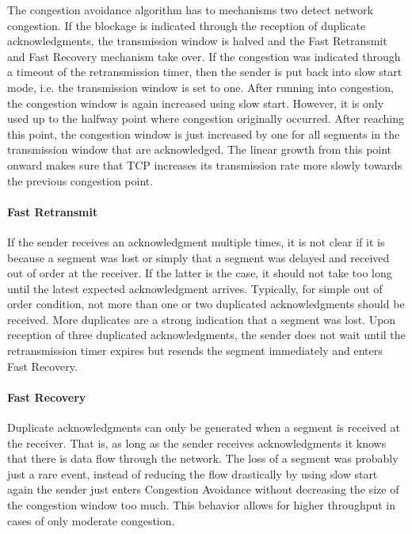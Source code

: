 The congestion avoidance algorithm has to mechanisms two detect network congestion. If the blockage is indicated through the reception of duplicate acknowledgments, the transmission window is halved and the Fast Retransmit and Fast Recovery mechanism take over. If the congestion was indicated through a timeout of the retransmission timer, then the sender is put back into slow start mode, i.e. the transmission window is set to one. After running into congestion, the congestion window is again increased using slow start. However, it is only used up to the halfway point where congestion originally occurred. After reaching this point, the congestion window is just increased by one for all segments in the transmission window that are acknowledged. The linear growth from this point onward makes sure that TCP increases its transmission rate more slowly towards the previous congestion point.  

\paragraph{Fast Retransmit}

If the sender receives an acknowledgment multiple times, it is not clear if it is because a segment was lost or simply that a segment was delayed and received out of order at the receiver. If the latter is the case, it should not take too long until the latest expected acknowledgment arrives. Typically, for simple out of order condition, not more than one or two duplicated acknowledgments should be received. More duplicates are a strong indication that a segment was lost. Upon reception of three duplicated acknowledgments, the sender does not wait until the retransmission timer expires but resends the segment immediately and enters Fast Recovery.

\paragraph{Fast Recovery}

Duplicate acknowledgments can only be generated when a segment is received at the receiver. That is, as long as the sender receives acknowledgments it knows that there is data flow through the network. The loss of a segment was probably just a rare event, instead of reducing the flow drastically by using slow start again the sender just enters Congestion Avoidance without decreasing the size of the congestion window too much. This behavior allows for higher throughput in cases of only moderate congestion.

